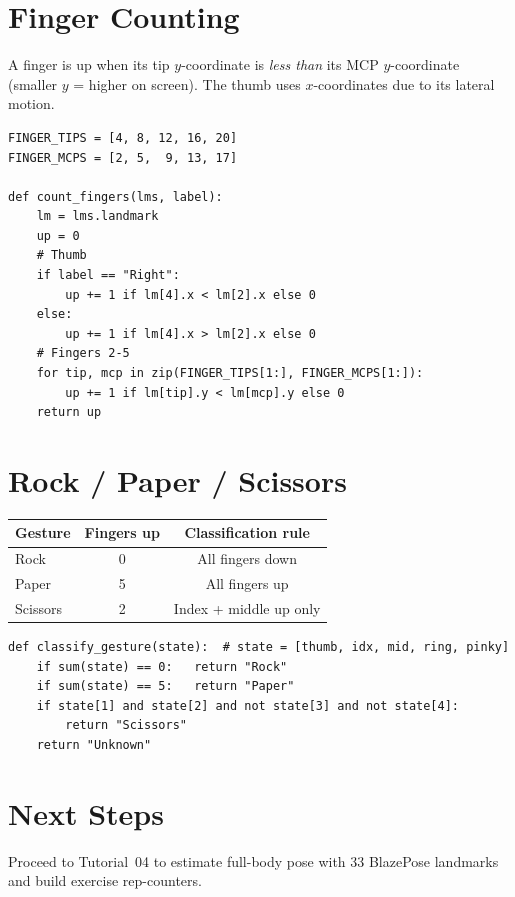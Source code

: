 \documentclass[12pt,a4paper]{article}
\begin{document}
\section{Finger Counting}

A finger is up when its tip $y$-coordinate is \emph{less than} its MCP $y$-coordinate
(smaller $y$ = higher on screen). The thumb uses $x$-coordinates due to its lateral motion.

\begin{lstlisting}[caption={Finger counting logic}]
FINGER_TIPS = [4, 8, 12, 16, 20]
FINGER_MCPS = [2, 5,  9, 13, 17]

def count_fingers(lms, label):
    lm = lms.landmark
    up = 0
    # Thumb
    if label == "Right":
        up += 1 if lm[4].x < lm[2].x else 0
    else:
        up += 1 if lm[4].x > lm[2].x else 0
    # Fingers 2-5
    for tip, mcp in zip(FINGER_TIPS[1:], FINGER_MCPS[1:]):
        up += 1 if lm[tip].y < lm[mcp].y else 0
    return up
\end{lstlisting}

\section{Rock / Paper / Scissors}

\begin{center}
\begin{tabular}{lcc}
\toprule
\textbf{Gesture} & \textbf{Fingers up} & \textbf{Classification rule} \\
\midrule
Rock     & 0 & All fingers down \\
Paper    & 5 & All fingers up \\
Scissors & 2 & Index + middle up only \\
\bottomrule
\end{tabular}
\end{center}

\begin{lstlisting}[caption={Gesture classifier}]
def classify_gesture(state):  # state = [thumb, idx, mid, ring, pinky]
    if sum(state) == 0:   return "Rock"
    if sum(state) == 5:   return "Paper"
    if state[1] and state[2] and not state[3] and not state[4]:
        return "Scissors"
    return "Unknown"
\end{lstlisting}

\section{Next Steps}

Proceed to Tutorial~04 to estimate full-body pose with 33 BlazePose landmarks and build
exercise rep-counters.
\end{document}
